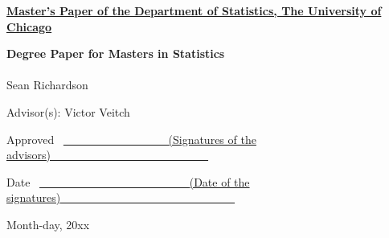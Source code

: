 \thispagestyle{empty}
\noindent
\underline{\bf Master's Paper of the Department of Statistics, The
  University of Chicago} 

\vspace{1.8in}
\begin{center}
{\bf\LARGE Degree Paper for Masters in Statistics}
\\~\\


\vspace{1.4in}
{\Large Sean Richardson}

\vspace{1.3in}
{\Large Advisor(s): Victor Veitch}

\end{center}

\vspace{.6in}
{\Large Approved} ~\underline{~~~~~~~~~~~~~~~~~~
\small (Signatures of the advisors)~~~~~~~~~~~~~~~~~~~~~~~~~~~~}

\vspace{.2in}
{\Large Date} ~\underline{~~~~~~~~~~~~~~~~~~~~~~~~~~
{\small (Date of the signatures)}~~~~~~~~~~~~~~~~~~~~~~~~~~~~~~~}

\vfill
\begin{center}{\large Month-day, 20xx}\end{center}

\clearpage